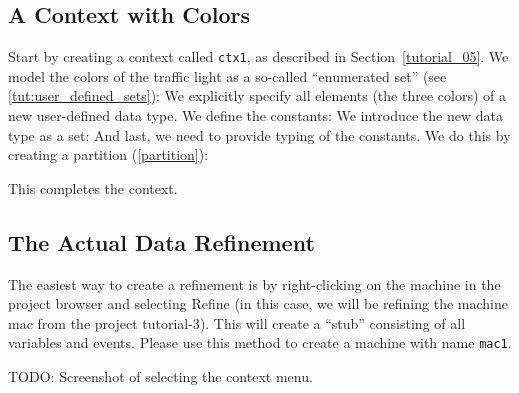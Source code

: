 \subsection{A Context with Colors}

Start by creating a context called \texttt{ctx1}, as described in Section~\ref{tutorial_05}.
We model the colors of the traffic light as a so-called ``enumerated set'' (see \ref{tut:user_defined_sets}): 
We explicitly specify all elements (the three colors) of a new user-defined data type.
We define the constants:
We introduce the new data type as a set:
And last, we need to provide typing of the constants.  We do this by creating a partition (\ref{partition}):


This completes the context.

\subsection{The Actual Data Refinement}

The easiest way to create a refinement is by right-clicking on the machine in the project browser and selecting \textsf{Refine} (in this case, we will be refining the machine \textsf{mac} from the project \textsf{tutorial-3}).  This will create a ``stub'' consisting of all variables and events. Please use this method to create a machine with name \texttt{mac1}.

TODO: Screenshot of selecting the context menu.

